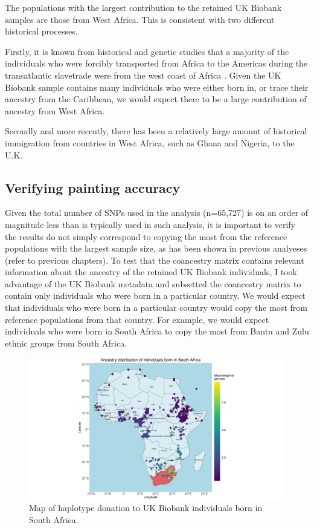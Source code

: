 The populations with the largest contribution to the retained UK Biobank samples are those from West Africa. This is consistent with two different historical processes. 

Firstly, it is known from historical and genetic studies that a majority of the individuals who were forcibly transported from Africa to the Americas during the transatlantic slavetrade were from the west coast of Africa \cite{micheletti2020genetic}. Given the UK Biobank sample contains many individuals who were either born in, or trace their ancestry from the Caribbean, we would expect there to be a large contribution of ancestry from West Africa.

Secondly and more recently, there has been a relatively large amount of historical immigration from countries in West Africa, such as Ghana and Nigeria, to the U.K. 

\subsection{Verifying painting accuracy}

Given the total number of SNPs used in the analysis (n=65,727) is on an order of magnitude less than is typically used in such analysis, it is important to verify the results do not simply correspond to copying the most from the reference populations with the largest sample size, as has been shown in previous analyeses (refer to previous chapters). To test that the coancestry matrix contains relevant information about the ancestry of the retained UK Biobank individuals, I took advantage of the UK Biobank metadata and subsetted the coancestry matrix to contain only individuals who were born in a particular country. We would expect that individuals who were born in a particular country would copy the most from reference populations from that country. For example, we would expect individuals who were born in South Africa to copy the most from Bantu and Zulu ethnic groups from South Africa. 

\begin{figure}[htp]
    \centering
    \includegraphics[width=1.0\textwidth]{../images/chapter3/haplotype_map_South Africa.png}
    \caption{Map of haplotype donation to UK Biobank individuals born in South Africa.}
    \label{fig:haplotype_map_South Africa}
\end{figure}

